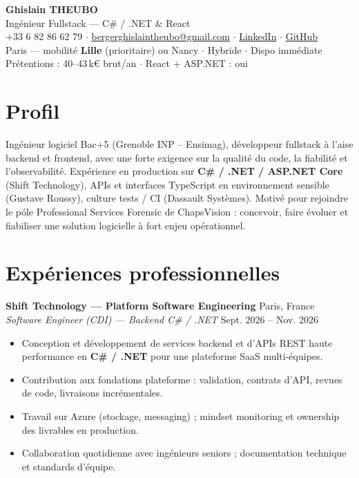 \documentclass[10pt,a4paper]{article}
\begin{document}
\begin{center}
{\LARGE\bfseries Ghislain THEUBO}\\[2pt]
{\large Ing\'enieur Fullstack --- C\# / .NET \& React}\\[3pt]
+33 6 82 86 62 79 $\cdot$
\href{mailto:bergerghislaintheubo@gmail.com}{bergerghislaintheubo@gmail.com} $\cdot$
\href{https://www.linkedin.com/in/berger-ghislain}{LinkedIn} $\cdot$
\href{https://github.com/Bergerghislain}{GitHub}\\[1pt]
Paris --- mobilit\'e \textbf{Lille} (prioritaire) ou Nancy $\cdot$ Hybride $\cdot$ Dispo imm\'ediate\\[1pt]
\small Pr\'etentions : 40--43\,k€ brut/an $\cdot$ React + ASP.NET : oui
\end{center}

\section{Profil}
Ing\'enieur logiciel Bac+5 (Grenoble INP -- Ensimag), d\'eveloppeur fullstack \`a l'aise backend et frontend, avec une forte exigence sur la qualit\'e du code, la fiabilit\'e et l'observabilit\'e. Exp\'erience en production sur \textbf{C\# / .NET / ASP.NET Core} (Shift Technology), APIs et interfaces TypeScript en environnement sensible (Gustave Roussy), culture tests / CI (Dassault Syst\`emes). Motiv\'e pour rejoindre le p\'ole Professional Services Forensic de ChapsVision : concevoir, faire \'evoluer et fiabiliser une solution logicielle \`a fort enjeu op\'erationnel.

\section{Exp\'eriences professionnelles}
\textbf{Shift Technology --- Platform Software Engineering} \hfill Paris, France\\
\textit{Software Engineer (CDI) --- Backend C\# / .NET} \hfill Sept. 2026 -- Nov. 2026
\begin{itemize}
  \item Conception et d\'eveloppement de services backend et d'APIs REST haute performance en \textbf{C\# / .NET} pour une plateforme SaaS multi-\'equipes.
  \item Contribution aux fondations plateforme : validation, contrats d'API, revues de code, livraisons incr\'ementales.
  \item Travail sur Azure (stockage, messaging) ; mindset monitoring et ownership des livrables en production.
  \item Collaboration quotidienne avec ing\'enieurs seniors ; documentation technique et standards d'\'equipe.
\end{itemize}
\end{document}
